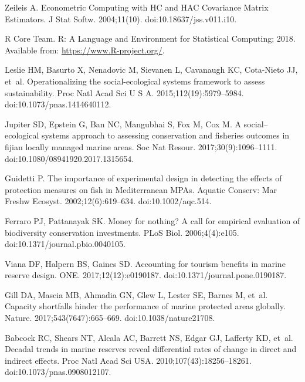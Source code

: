 \documentclass[10pt,letterpaper]{article}
\begin{document}
\begin{thebibliography}{10}
Zeileis A.
\newblock Econometric Computing with HC and HAC Covariance Matrix Estimators.
\newblock J Stat Softw. 2004;11(10).
\newblock doi:{10.18637/jss.v011.i10}.

{R Core Team}. R: A Language and Environment for Statistical Computing; 2018.
\newblock Available from: \url{https://www.R-project.org/}.

Leslie HM, Basurto X, Nenadovic M, Sievanen L, Cavanaugh KC, Cota-Nieto JJ,
  et~al.
\newblock Operationalizing the social-ecological systems framework to assess
  sustainability.
\newblock Proc Natl Acad Sci U S A. 2015;112(19):5979--5984.
\newblock doi:{10.1073/pnas.1414640112}.

Jupiter SD, Epstein G, Ban NC, Mangubhai S, Fox M, Cox M.
\newblock A social–ecological systems approach to assessing conservation and
  fisheries outcomes in fijian locally managed marine areas.
\newblock Soc Nat Resour. 2017;30(9):1096--1111.
\newblock doi:{10.1080/08941920.2017.1315654}.

Guidetti P.
\newblock The importance of experimental design in detecting the effects of
  protection measures on fish in Mediterranean {MPAs}.
\newblock Aquatic Conserv: Mar Freshw Ecosyst. 2002;12(6):619--634.
\newblock doi:{10.1002/aqc.514}.

Ferraro PJ, Pattanayak SK.
\newblock Money for nothing? A call for empirical evaluation of biodiversity
  conservation investments.
\newblock PLoS Biol. 2006;4(4):e105.
\newblock doi:{10.1371/journal.pbio.0040105}.

Viana DF, Halpern BS, Gaines SD.
\newblock Accounting for tourism benefits in marine reserve design.
 {ONE}. 2017;12(12):e0190187.
\newblock doi:{10.1371/journal.pone.0190187}.

Gill DA, Mascia MB, Ahmadia GN, Glew L, Lester SE, Barnes M, et~al.
\newblock Capacity shortfalls hinder the performance of marine protected areas
  globally.
\newblock Nature. 2017;543(7647):665--669.
\newblock doi:{10.1038/nature21708}.

Babcock RC, Shears NT, Alcala AC, Barrett NS, Edgar GJ, Lafferty KD, et~al.
\newblock Decadal trends in marine reserves reveal differential rates of change
  in direct and indirect effects.
\newblock Proc Natl Acad Sci {USA}. 2010;107(43):18256--18261.
\newblock doi:{10.1073/pnas.0908012107}.


\end{thebibliography}
\end{document}
